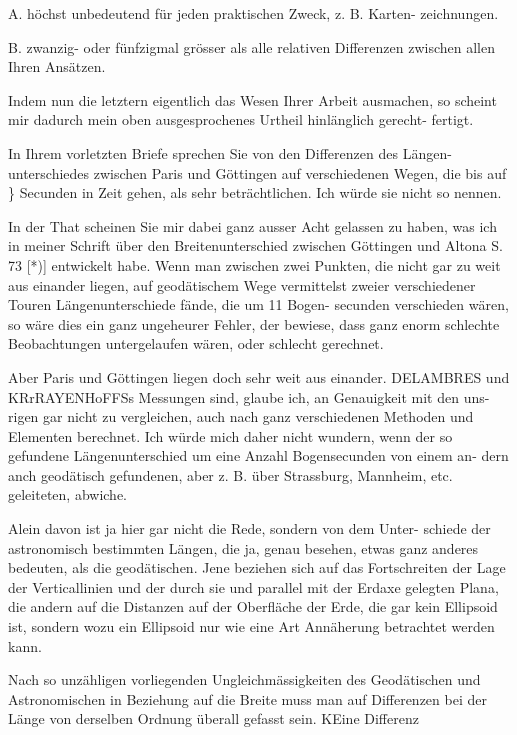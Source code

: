 \documentclass[12pt,a4paper]{article}
\theoremstyle{plain}
\theoremstyle{definition}
\theoremstyle{remark}
\begin{document}
\noindent
A. höchst unbedeutend für jeden praktischen Zweck, z. B. Karten-
zeichnungen.

\noindent
B. zwanzig- oder fünfzigmal grösser als alle relativen Differenzen
zwischen allen Ihren Ansätzen.

\noindent

\noindent

\noindent
Indem nun die letztern eigentlich das Wesen Ihrer Arbeit ausmachen,
so scheint mir dadurch mein oben ausgesprochenes Urtheil hinlänglich gerecht-
fertigt.

\noindent
In Ihrem vorletzten Briefe sprechen Sie von den Differenzen des Längen-
unterschiedes zwischen Paris und Göttingen auf verschiedenen Wegen, die bis
auf \} Secunden in Zeit gehen, als sehr beträchtlichen. Ich würde sie nicht
so nennen.

\noindent
In der That scheinen Sie mir dabei ganz ausser Acht gelassen zu haben,
was ich in meiner Schrift über den Breitenunterschied zwischen Göttingen
und Altona S. 73 [*)] entwickelt habe. Wenn man zwischen zwei Punkten, die
nicht gar zu weit aus einander liegen, auf geodätischem Wege vermittelst
zweier verschiedener Touren Längenunterschiede fände, die um 11 Bogen-
secunden verschieden wären, so wäre dies ein ganz ungeheurer Fehler, der
bewiese, dass ganz enorm schlechte Beobachtungen untergelaufen wären, oder
schlecht gerechnet.

\noindent
Aber Paris und Göttingen liegen doch sehr weit aus einander. DELAMBRES
und KRrRAYENHoFFSs Messungen sind, glaube ich, an Genauigkeit mit den uns-
rigen gar nicht zu vergleichen, auch nach ganz verschiedenen Methoden und
Elementen berechnet. Ich würde mich daher nicht wundern, wenn der so
gefundene Längenunterschied um eine Anzahl Bogensecunden von einem an-
dern anch geodätisch gefundenen, aber z. B. über Strassburg, Mannheim, etc.
geleiteten, abwiche.

\noindent
Alein davon ist ja hier gar nicht die Rede, sondern von dem Unter-
schiede der astronomisch bestimmten Längen, die ja, genau besehen, etwas
ganz anderes bedeuten, als die geodätischen. Jene beziehen sich auf das
Fortschreiten der Lage der Verticallinien und der durch sie und parallel mit
der Erdaxe gelegten Plana, die andern auf die Distanzen auf der Oberfläche
der Erde, die gar kein Ellipsoid ist, sondern wozu ein Ellipsoid nur wie
eine Art Annäherung betrachtet werden kann.

\noindent
Nach so unzähligen vorliegenden Ungleichmässigkeiten des Geodätischen
und Astronomischen in Beziehung auf die Breite muss man auf Differenzen
bei der Länge von derselben Ordnung überall gefasst sein. KEine Differenz
\end{document}
